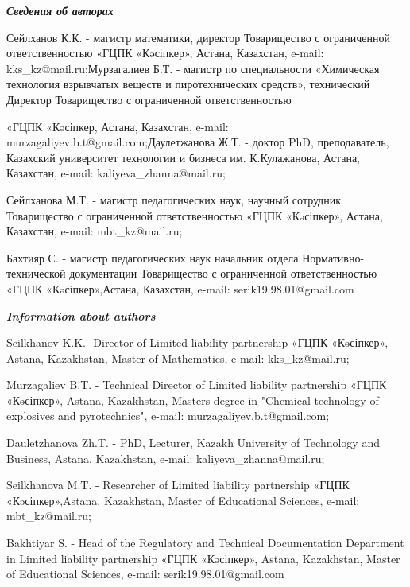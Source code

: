 \emph{{\bfseries Сведения об авторах}}

\begin{noparindent}
Сейлханов К.К. - магистр математики, директор Товарищество с
ограниченной ответственностью «ГЦПК «Кəсіпкер», Астана, Казахстан,
e-mail: kks\_kz@mail.ru;Мурзагалиев Б.Т. - магистр по специальности
«Химическая технология взрывчатых веществ и пиротехнических средств»,
технический Директор Товарищество с ограниченной ответственностью

«ГЦПК «Кəсіпкер, Астана, Казахстан, e-mail:
murzagaliyev.b.t@gmail.com;Даулетжанова Ж.Т. - доктор PhD,
преподаватель, Казахский университет технологии и бизнеса им.
К.Кулажанова, Астана, Казахстан, e-mail: kaliyeva\_zhanna@mail.ru;

Сейлханова М.Т. - магистр педагогических наук, научный сотрудник
Товарищество с ограниченной ответственностью «ГЦПК «Кəсіпкер», Астана,
Казахстан, e-mail: mbt\_kz@mail.ru;

Бахтияр С. - магистр педагогических наук начальник отдела
Нормативно-технической документации Товарищество с ограниченной
ответственностью «ГЦПК «Кəсіпкер»,Астана, Казахстан, e-mail:
serik19.98.01@gmail.com
\end{noparindent}

\emph{{\bfseries Information about authors}}

\begin{noparindent}
Seilkhanov K.K.- Director of Limited liability partnership «ГЦПК
«Кəсіпкер», Astana, Kazakhstan, Master of Mathematics, e-mail:
kks\_kz@mail.ru;

Murzagaliev B.T. - Technical Director of Limited liability partnership
«ГЦПК «Кəсіпкер», Astana, Kazakhstan, Master\textquotesingle s degree in
"Chemical technology of explosives and pyrotechnics", e-mail:
murzagaliyev.b.t@gmail.com;

Dauletzhanova Zh.T. - PhD, Lecturer, Kazakh University of Technology and
Business, Astana, Kazakhstan, e-mail: kaliyeva\_zhanna@mail.ru;

Seilkhanova M.T. - Researcher of Limited liability partnership «ГЦПК
«Кəсіпкер»,Astana, Kazakhstan, Master of Educational Sciences, e-mail:
mbt\_kz@mail.ru;

Bakhtiyar S. - Head of the Regulatory and Technical Documentation
Department in Limited liability partnership «ГЦПК «Кəсіпкер», Astana,
Kazakhstan, Master of Educational Sciences, e-mail:
serik19.98.01@gmail.com
\end{noparindent}
